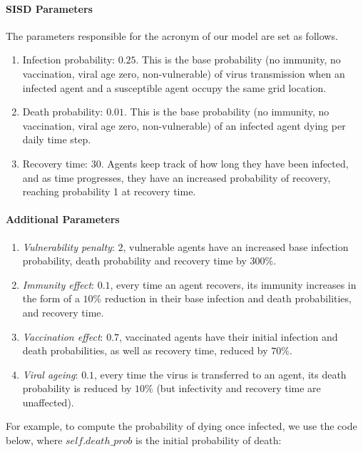 \documentclass[a4paper,12pt]{article}
\begin{document}
\paragraph{SISD Parameters} The parameters responsible for the acronym of our model are set as follows.
\begin{enumerate}
    \item Infection probability: $0.25$. This is the base probability (no immunity, no vaccination, viral age zero, non-vulnerable) of virus transmission when an infected agent and a susceptible agent occupy the same grid location.
    \item Death probability: $0.01$. This is the base probability (no immunity, no vaccination, viral age zero, non-vulnerable) of an infected agent dying per daily time step.
    \item Recovery time: $30$. Agents keep track of how long they have been infected, and as time progresses, they have an increased probability of recovery, reaching probability 1 at recovery time.
\end{enumerate}

\paragraph{Additional Parameters}
\begin{enumerate}
\item \textit{Vulnerability penalty}: $2$, vulnerable agents have an increased base infection probability, death probability and recovery time by $300\%$.
\item \textit{Immunity effect}: $0.1$, every time an agent recovers, its immunity increases in the form of a $10\%$ reduction in their base infection and death probabilities, and recovery time.
\item \textit{Vaccination effect}: $0.7$, vaccinated agents have their initial infection and death probabilities, as well as recovery time, reduced by $70\%$.
\item \textit{Viral ageing}: $0.1$, every time the virus is transferred to an agent, its death probability is reduced by $10\%$ (but infectivity and recovery time are unaffected).
\end{enumerate}

\strut
For example, to compute the probability of dying once infected, we use the code below, where $self.death\_prob$ is the initial probability of death:
\end{document}
